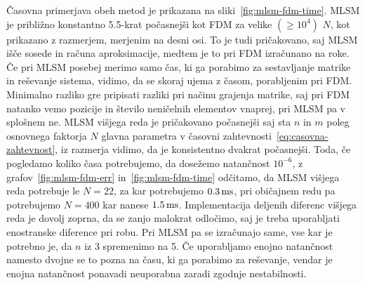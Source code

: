 \documentclass[12pt,a4paper,twoside]{article}
\theoremstyle{definition} %
\theoremstyle{plain} %
\numberwithin{equation}{section}
\begin{document}
Časovna primerjava obeh metod je prikazana na sliki~\ref{fig:mlsm-fdm-time}.
MLSM je približno konstantno 5.5-krat počasnejši kot FDM za velike $(\geq
10^4)$ $N$, kot prikazano z razmerjem, merjenim na desni osi. To je tudi
pričakovano, saj MLSM išče sosede in računa aproksimacije, medtem je to pri FDM
izračunano na roke.  Če pri MLSM posebej merimo samo čas, ki ga porabimo za
sestavljanje matrike in reševanje sistema, vidimo, da se skoraj ujema z časom,
porabljenim pri FDM.  Minimalno razliko gre pripisati razliki pri načinu
grajenja matrike, saj pri FDM natanko vemo pozicije in število neničelnih
elementov vnaprej, pri MLSM pa v splošnem ne. MLSM višjega reda je pričakovano
počasnejši saj sta $n$ in $m$ poleg osnovnega faktorja $N$ glavna parametra v
časovni zahtevnosti~\eqref{eq:casovna-zahtevnost}, iz razmerja vidimo, da je
konsistentno dvakrat počasnejši. Toda, če pogledamo koliko časa potrebujemo, da
dosežemo natančnost $10^{-6}$, z grafov~\ref{fig:mlsm-fdm-err}
in~\ref{fig:mlsm-fdm-time} odčitamo, da MLSM višjega reda potrebuje le $N = 22$,
za kar potrebujemo $\unit[0.3]{ms}$, pri običajnem redu pa potrebujemo
$N = 400$ kar nanese $\unit[1.5]{ms}$. Implementacija deljenih diferenc višjega
reda je dovolj zoprna, da se zanjo malokrat odločimo, saj je treba uporabljati
enostranske diference pri robu. Pri MLSM pa se izračunajo same, vse kar je
potrebno je, da $n$ iz 3 spremenimo na 5. Če uporabljamo enojno natančnost
namesto dvojne se to pozna na času, ki ga porabimo za reševanje, vendar je
enojna natančnost ponavadi neuporabna zaradi zgodnje nestabilnosti.

\end{document}
